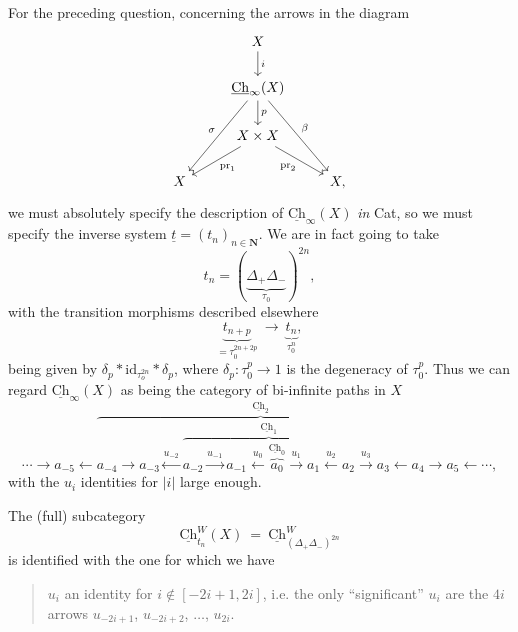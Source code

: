 \documentclass[11pt]{article}
\newcommand{\printedpage}[1]{\marginpar{\footnotesize p.~#1}}
\newcommand{\Ch}{\underline{\mathrm{Ch}}}
\begin{document}
For the preceding question, concerning the arrows in the diagram
\[
\begin{tikzcd}
& X \arrow[d, "i"] & \\
& \Ch_{\infty}(X) \arrow[d, "p"] \arrow[ddl, "\sigma"'] \arrow[ddr, "\beta"] & \\
& X \times X \arrow[dl, "\mathrm{pr}_1"] \arrow[dr, "\mathrm{pr}_2"'] & \\
X & & X,
\end{tikzcd}
\]
we must absolutely specify the description of $\Ch_{\infty}(X)$ \textit{in} Cat, so we must specify the inverse system $\underline{t} = (t_n)_{n \in \mathbf{N}}$. We are in fact going to take %
\[
t_n = (\underbrace{\Delta_+ \Delta_-}_{\tau_0})^{2n},
\]
with the transition morphisms described elsewhere
\[
\underbrace{t_{n+p}}_{=\tau_0^{2n+2p}} \ \longrightarrow \ \underbrace{t_n}_{\tau_0^{n}}, %
\]
\printedpage{91}
being given by $\delta_p * \mathrm{id}_{\tau_o^{2n}} * \delta_p$, where $\delta_p : \tau_0^p \longrightarrow 1$ is the degeneracy of $\tau_0^p$. Thus we can regard $\Ch_{\infty}(X)$ as being the category of bi-infinite paths in $X$ %
\[
\cdots \longrightarrow a_{-5} \longleftarrow \overbrace{a_{-4} \longrightarrow a_{-3} \xleftarrow{u_{-2}} \overbrace{a_{-2} \xrightarrow{u_{-1}} a_{-1} \xleftarrow{u_0} \overbrace{a_0}^{\Ch_0} \xrightarrow{u_1} a_1 \xleftarrow{u_2} a_2}^{\Ch_1} \xrightarrow{u_3} a_3 \longleftarrow a_4}^{\Ch_2} \longrightarrow a_5 \longleftarrow \cdots,
\]
with the $u_i$ identities for $|i|$ large enough.

The (full) subcategory
\[
\Ch^{W}_{t_n}(X) \ = \ \Ch^{W}_{(\Delta_+\Delta_-)^{2n}}
\]
is identified with the one for which we have
\begin{quote}
$u_i$ an identity for $i \notin [-2i+1, 2i]$, i.e. the only ``significant'' $u_i$ are the $4i$ arrows $u_{-2i+1}$, $u_{-2i+2}$, $\ldots$, $u_{2i}$. %
\end{quote}
\end{document}
